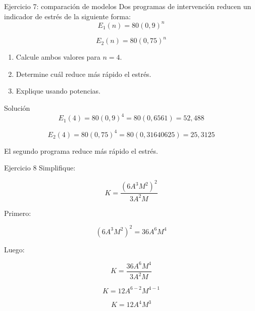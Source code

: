 \documentclass[handout,aspectratio=169]{beamer}
\begin{document}
	
	\begin{frame}{Ejercicio 7: comparación de modelos}
		Dos programas de intervención reducen un indicador de estrés de la siguiente forma:
		\[
		E_1(n)=80(0{,}9)^n
		\]
		
		\[
		E_2(n)=80(0{,}75)^n
		\]
		
		\begin{enumerate}
			\item Calcule ambos valores para \(n=4\).
			\item Determine cuál reduce más rápido el estrés.
			\item Explique usando potencias.
		\end{enumerate}
		
		\pause
		
		\begin{block}{Solución}
			\[
			E_1(4)=80(0{,}9)^4=80(0{,}6561)=52{,}488
			\]
			
			\[
			E_2(4)=80(0{,}75)^4=80(0{,}31640625)=25{,}3125
			\]
			
			El segundo programa reduce más rápido el estrés.
		\end{block}
	\end{frame}
	
	\begin{frame}{Ejercicio 8}
		Simplifique:
		
		\[
		K=
		\frac{(6A^3M^2)^2}{3A^2M}
		\]
		
		\pause
		
		Primero:
		
		\[
		(6A^3M^2)^2
		=
		36A^6M^4
		\]
		
		Luego:
		
		\[
		K=\frac{36A^6M^4}{3A^2M}
		\]
		
		\[
		K=12A^{6-2}M^{4-1}
		\]
		
		\[
		K=12A^4M^3
		\]
		
		
	\end{frame}
	
\end{document}
